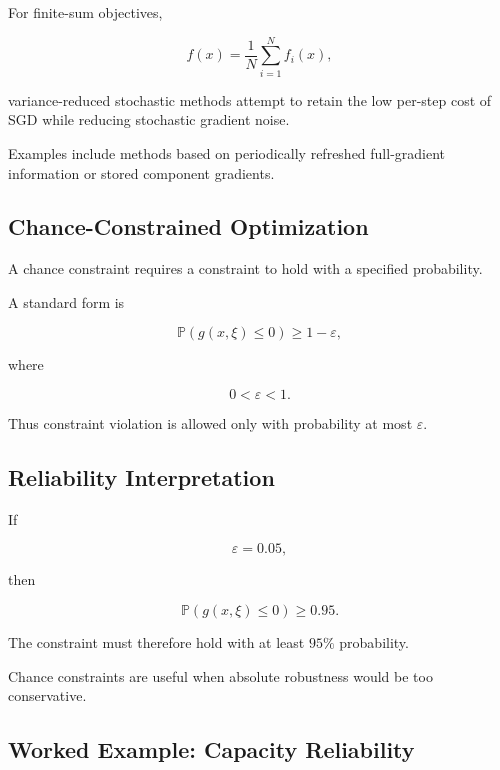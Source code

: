 For finite-sum objectives,

\[
\boxed{
f(x)
=
\frac1N
\sum_{i=1}^{N}
f_i(x),
}
\]

variance-reduced stochastic methods attempt to retain the low per-step cost
of SGD while reducing stochastic gradient noise.

Examples include methods based on periodically refreshed full-gradient
information or stored component gradients.

\subsection{Chance-Constrained Optimization}
\label{subsec:chance-constrained-optimization}

A chance constraint requires a constraint to hold with a specified
probability.

A standard form is

\[
\boxed{
\mathbb{P}
\left(
g(x,\xi)\leq0
\right)
\geq
1-\varepsilon,
}
\]

where

\[
0<\varepsilon<1.
\]

Thus constraint violation is allowed only with probability at most
\(\varepsilon\).

\subsection{Reliability Interpretation}
\label{subsec:chance-constraint-reliability}

If

\[
\varepsilon=0.05,
\]

then

\[
\boxed{
\mathbb{P}
(
g(x,\xi)\leq0
)
\geq0.95.
}
\]

The constraint must therefore hold with at least \(95\%\) probability.

Chance constraints are useful when absolute robustness would be too
conservative.

\subsection{Worked Example: Capacity Reliability}
\label{subsec:worked-chance-constraint}

